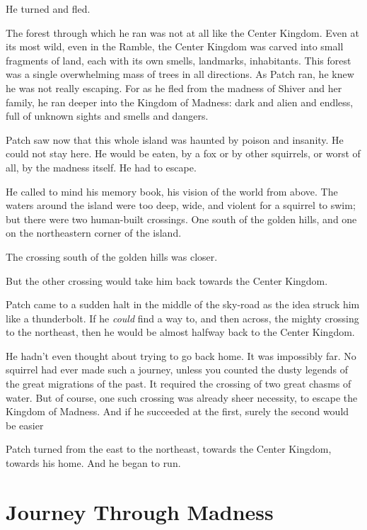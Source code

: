 \documentclass[12pt]{book}
\begin{document}
 He turned and fled.\par
 The forest through which he ran was not at all like the Center Kingdom. Even at its most wild, even in the Ramble, the Center Kingdom was carved into small fragments of land, each with its own smells, landmarks, inhabitants. This forest was a single overwhelming mass of trees in all directions. As Patch ran, he knew he was not really escaping. For as he fled from the madness of Shiver and her family, he ran deeper into the Kingdom of Madness: dark and alien and endless, full of unknown sights and smells and dangers.\par
 Patch saw now that this whole island was haunted by poison and insanity. He could not stay here. He would be eaten, by a fox or by other squirrels, or worst of all, by the madness itself. He had to escape.\par
He called to mind his memory book, his vision of the world from above. The waters around the island were too deep, wide, and violent for a squirrel to swim; but there were two human-built crossings. One south of the golden hills, and one on the northeastern corner of the island.\par
The crossing south of the golden hills was closer.\par
But the other crossing would take him back towards the Center Kingdom.\par
 Patch came to a sudden halt in the middle of the sky-road as the idea struck him like a thunderbolt. If he {\it could} find a way to, and then across, the mighty crossing to the northeast, then he would be almost halfway back to the Center Kingdom.\par
 He hadn't even thought about trying to go back home. It was impossibly far. No squirrel had ever made such a journey, unless you counted the dusty legends of the great migrations of the past. It required the crossing of two great chasms of water. But of course, one such crossing was already sheer necessity, to escape the Kingdom of Madness. And if he succeeded at the first, surely the second would be easier %
\par
 Patch turned from the east to the northeast, towards the Center Kingdom, towards his home. And he began to run.\par

\section{Journey Through Madness}
\end{document}
